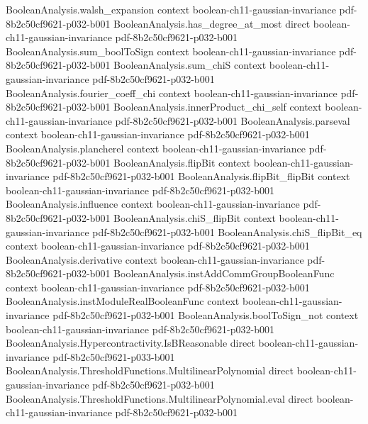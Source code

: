 \begin{theorem}
\proofstep
  {BooleanAnalysis.walsh_expansion}
  {context}
  {boolean-ch11-gaussian-invariance}
  {pdf-8b2c50cf9621-p032-b001}
\proofstep
  {BooleanAnalysis.has_degree_at_most}
  {direct}
  {boolean-ch11-gaussian-invariance}
  {pdf-8b2c50cf9621-p032-b001}
\proofstep
  {BooleanAnalysis.sum_boolToSign}
  {context}
  {boolean-ch11-gaussian-invariance}
  {pdf-8b2c50cf9621-p032-b001}
\proofstep
  {BooleanAnalysis.sum_chiS}
  {context}
  {boolean-ch11-gaussian-invariance}
  {pdf-8b2c50cf9621-p032-b001}
\proofstep
  {BooleanAnalysis.fourier_coeff_chi}
  {context}
  {boolean-ch11-gaussian-invariance}
  {pdf-8b2c50cf9621-p032-b001}
\proofstep
  {BooleanAnalysis.innerProduct_chi_self}
  {context}
  {boolean-ch11-gaussian-invariance}
  {pdf-8b2c50cf9621-p032-b001}
\proofstep
  {BooleanAnalysis.parseval}
  {context}
  {boolean-ch11-gaussian-invariance}
  {pdf-8b2c50cf9621-p032-b001}
\proofstep
  {BooleanAnalysis.plancherel}
  {context}
  {boolean-ch11-gaussian-invariance}
  {pdf-8b2c50cf9621-p032-b001}
\proofstep
  {BooleanAnalysis.flipBit}
  {context}
  {boolean-ch11-gaussian-invariance}
  {pdf-8b2c50cf9621-p032-b001}
\proofstep
  {BooleanAnalysis.flipBit_flipBit}
  {context}
  {boolean-ch11-gaussian-invariance}
  {pdf-8b2c50cf9621-p032-b001}
\proofstep
  {BooleanAnalysis.influence}
  {context}
  {boolean-ch11-gaussian-invariance}
  {pdf-8b2c50cf9621-p032-b001}
\proofstep
  {BooleanAnalysis.chiS_flipBit}
  {context}
  {boolean-ch11-gaussian-invariance}
  {pdf-8b2c50cf9621-p032-b001}
\proofstep
  {BooleanAnalysis.chiS_flipBit_eq}
  {context}
  {boolean-ch11-gaussian-invariance}
  {pdf-8b2c50cf9621-p032-b001}
\proofstep
  {BooleanAnalysis.derivative}
  {context}
  {boolean-ch11-gaussian-invariance}
  {pdf-8b2c50cf9621-p032-b001}
\proofstep
  {BooleanAnalysis.instAddCommGroupBooleanFunc}
  {context}
  {boolean-ch11-gaussian-invariance}
  {pdf-8b2c50cf9621-p032-b001}
\proofstep
  {BooleanAnalysis.instModuleRealBooleanFunc}
  {context}
  {boolean-ch11-gaussian-invariance}
  {pdf-8b2c50cf9621-p032-b001}
\proofstep
  {BooleanAnalysis.boolToSign_not}
  {context}
  {boolean-ch11-gaussian-invariance}
  {pdf-8b2c50cf9621-p032-b001}
\proofstep
  {BooleanAnalysis.Hypercontractivity.IsBReasonable}
  {direct}
  {boolean-ch11-gaussian-invariance}
  {pdf-8b2c50cf9621-p033-b001}
\proofstep
  {BooleanAnalysis.ThresholdFunctions.MultilinearPolynomial}
  {direct}
  {boolean-ch11-gaussian-invariance}
  {pdf-8b2c50cf9621-p032-b001}
\proofstep
  {BooleanAnalysis.ThresholdFunctions.MultilinearPolynomial.eval}
  {direct}
  {boolean-ch11-gaussian-invariance}
  {pdf-8b2c50cf9621-p032-b001}
\proofstep

\end{theorem}
